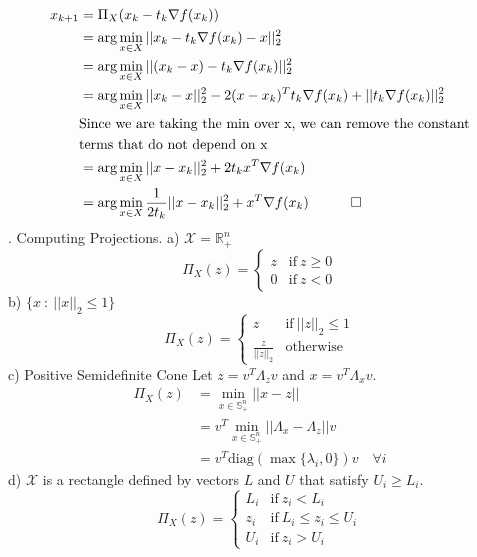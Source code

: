 \documentclass{article}
\begin{document}
\begin{align*}
	x_{k+1} &= \Pi_X(x_k - t_k\nabla f(x_k)) \\
	&= \text{arg}\min_{x\in X}{|| x_k - t_k\nabla f(x_k) - x ||^2_2} \\
	&= \text{arg}\min_{x\in X}{|| (x_k - x) - t_k\nabla f(x_k)||^2_2} \\
	&= \text{arg}\min_{x\in X}{|| x_k - x ||^2_2 - 2(x- x_k)^Tt_k\nabla f(x_k) + ||t_k\nabla f(x_k)||^2_2} \\
	& \text{Since we are taking the min over x, we can remove the constant} \\
	& \text{terms that do not depend on x} \\
	&= \text{arg}\min_{x\in X}{||x - x_k||^2_2 + 2t_kx^T\nabla f(x_k)} \\
	&= \text{arg}\min_{x\in X}{\frac{1}{2t_k}||x - x_k ||^2_2 + x^T\nabla f(x_k)} \quad \qed
\end{align*}
\newpage
{}. Computing Projections.
\newline
a) $\mathcal{X} = \mathbb{R}^n_+$
\begin{equation*}
	\Pi_X(z) = \begin{cases}
		z & \text{if} \ z \geq 0 \\
		0 & \text{if} \ z< 0
	\end{cases}
\end{equation*}
b) $\{x \ : \ ||x||_2 \leq 1\}$
\begin{equation*}
	\Pi_X(z) = \begin{cases}
		z & \text{if} \ ||z||_2 \leq 1\\
		\frac{z}{||z||_2} & \text{otherwise}
	\end{cases}
\end{equation*}
c) Positive Semidefinite Cone \newline
Let $z = v^T\Lambda_zv$ and $ x = v^T\Lambda_xv$. 
\begin{align*}
	\Pi_X(z) &= \min_{x \in \mathbb{S}^n_+}|| x- z || \\
	&= v^T \min_{x \in \mathbb{S}^n_+}{||\Lambda_x - \Lambda_z}||v \\
	&= v^T\text{diag}(\max\{\lambda_i, 0\})v \quad \forall i
\end{align*}
d) $\mathcal{X}$ is a rectangle defined by vectors $L$ and $U$ that satisfy $U_i \geq L_i$. 
\begin{equation*}
	\Pi_X(z) = \begin{cases}
		L_i & \text{if} \ z_i < L_i \\
		z_i & \text{if} \ L_i \leq z_i \leq U_i \\
		U_i & \text{if} \ z_i > U_i
	\end{cases}
\end{equation*}
\end{document}

